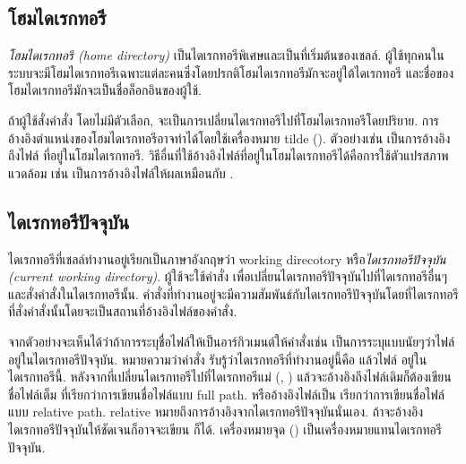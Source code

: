 \begin{thwbr}
\subsection{โฮมไดเรกทอรี}
\emph{โฮมไดเรกทอรี (home directory)} เป็นไดเรกทอรีพิเศษและเป็นที่เริ่มต้นของเชลล์. ผู้ใช้ทุกคนในระบบจะมีโฮมไดเรกทอรีเฉพาะแต่ละคนซึ่งโดยปรกติโฮมไดเรกทอรีมักจะอยู่ใต้ไดเรกทอรี  และชื่อของโฮมไดเรกทอรีมักจะเป็นชื่อล็อกอินของผู้ใช้.

ถ้าผู้ใช้สั่งคำสั่ง  โดยไม่มีตัวเลือก, จะเป็นการเปลี่ยนไดเรกทอรีไปที่โฮมไดเรกทอรีโดยปริยาย. การอ้างอิงตำแหน่งของโฮมไดเรกทอรีอาจทำได้โดยใช้เครื่องหมาย tilde (\cmd{\~}). ตัวอย่างเช่น  เป็นการอ้างอิงถึงไฟล์  ที่อยู่ในโฮมไดเรกทอรี. วิธีอื่นที่ใช้อ้างอิงไฟล์ที่อยู่ในโฮมไดเรกทอรีได้คือการใช้ตัวแปรสภาพแวดล้อม  เช่น  เป็นการอ้างอิงไฟล์ให้ผลเหมือนกับ .

\subsection{ไดเรกทอรีปัจจุบัน}
ไดเรกทอรีที่เชลล์ทำงานอยู่เรียกเป็นภาษาอังกฤษว่า working direcotory หรือ\emph{ไดเรกทอรีปัจจุบัน (current working directory)}. ผู้ใช้จะใช้คำสั่ง  เพื่อเปลี่ยนไดเรกทอรีปัจจุบันไปที่ไดเรกทอรีอื่นๆและสั่งคำสั่งในไดเรกทอรีนั้น. คำสั่งที่ทำงานอยู่จะมีความสัมพันธ์กับไดเรกทอรีปัจจุบันโดยที่ไดเรกทอรีที่สั่งคำสั่งนั้นโดยจะเป็นสถานที่อ้างอิงไฟล์ของคำสั่ง. 

\begin{MyExample}
\end{MyExample}%

จากตัวอย่างจะเห็นได้ว่าถ้าการระบุชื่อไฟล์ให้เป็นอาร์กิวเมนต์ให้คำสั่งเช่น  เป็นการระบุแบบนัยๆว่าไฟล์  อยู่ในไดเรกทอรีปัจจุบัน. หมายความว่าคำสั่ง  รับรู้ว่าไดเรกทอรีที่ทำงานอยู่นี้คือ  แล้วไฟล์  อยู่ในไดเรกทอรีนี้. หลังจากที่เปลี่ยนไดเรกทอรีไปที่ไดเรกทอรีแม่ (, ) แล้วจะอ้างอิงถึงไฟล์เดิมก็ต้องเขียนชื่อไฟล์เต็ม  ที่เรียกว่าการเขียนชื่อไฟล์แบบ full path. หรืออ้างอิงไฟล์เป็น  เรียกว่าการเขียนชื่อไฟล์แบบ relative path. relative หมายถึงการอ้างอิงจากไดเรกทอรีปัจจุบันนั่นเอง. ถ้าจะอ้างอิงไดเรกทอรีปัจจุบันให้ชัดเจนก็อาจจะเขียน  ก็ได้. เครื่องหมายจุด () เป็นเครื่องหมายแทนไดเรกทอรีปัจจุบัน.


\end{thwbr}
